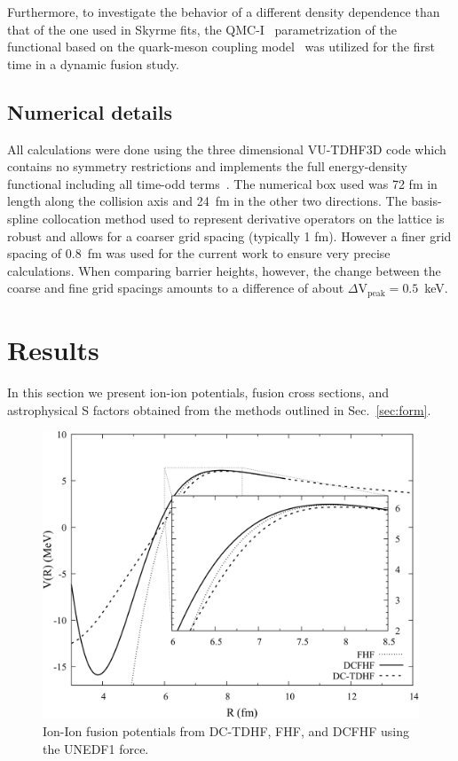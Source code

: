 Furthermore, to investigate the behavior of a different density dependence than that of the one used in Skyrme fits, the QMC-I~\protect\citep{stone2016} parametrization of the functional based on the quark-meson coupling model~\protect\citep{guichon1988,guichon1996} was utilized for the first time in a dynamic fusion study.

\subsection{Numerical details}

All calculations were done using the three dimensional VU-TDHF3D code which contains no symmetry restrictions and implements the full energy-density functional including all time-odd terms~\protect\citep{umar2006c}. 
The numerical box used was 72 fm in length along the collision axis and 24~fm in the other two directions.
The basis-spline collocation method used to represent derivative operators on the lattice is robust and allows for a coarser grid spacing (typically 1 fm).
However a finer grid spacing of 0.8~fm was used for the current work to ensure very precise calculations. 
When comparing barrier heights, however, the change between the coarse and fine grid spacings amounts to a difference of about $\Delta \mathrm{V}_{\mathrm{peak}}=0.5$~keV.

\section{Results}
\label{cc:sec:res}



In this section we present ion-ion potentials, fusion cross sections, and astrophysical S factors obtained from the methods outlined in Sec.~\ref{sec:form}.
\begin{figure}
	\includegraphics[width=\textwidth]{../Figures/CC/PotentialsComp.pdf}
	\caption{Ion-Ion fusion potentials from DC-TDHF, FHF, and DCFHF using the UNEDF1 force.}
	\label{fig:pots}
\end{figure}


